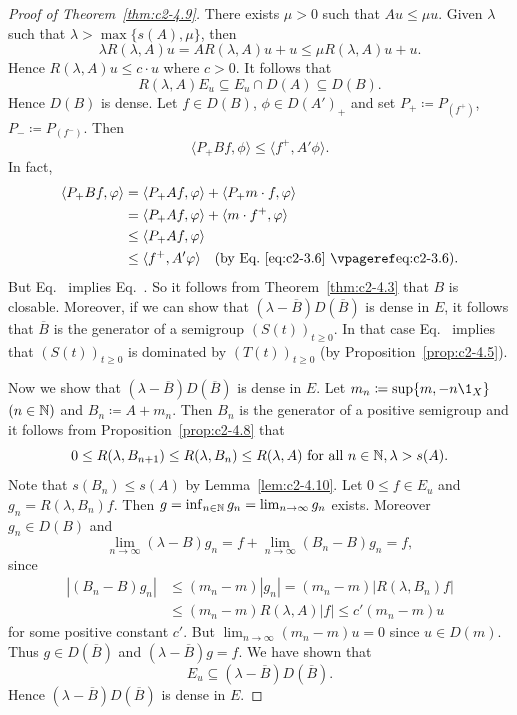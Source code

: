\begin{proof}[Proof of Theorem~\ref{thm:c2-4.9}]  
There exists $\mu > 0$ such that $Au \leq \mu u$.
Given $\lambda$ such that  $\lambda > \max \{s(A),\mu\}$, 
then 
\[
\lambda R(\lambda,A)u = AR(\lambda,A)u+u \leq \mu R(\lambda,A)u + u .
\]
Hence $R(\lambda,A)u \leq c \cdot u$ where $c > 0$.
It follows that 
\[
R(\lambda,A)E_{u} \subseteq E_{u} \cap D(A) \subseteq D(B) .
\]
Hence $D(B)$ is dense.
Let $f \in D(B)$, $\phi \in D(A')_{+}$ and set $P_{+} \coloneq P_{(f^{+})}$, $P_{-} \coloneq P_{(f^{-})}$.
Then
\begin{equation}\label{eq:c2-4.11}
\langle P_{+} Bf,\phi \rangle \leq \langle f^{+},A'\phi \rangle.
\end{equation}
In fact, 
\begin{align*}
\langle P_{+} Bf, \phi \rangle &= \langle P_{+} Af, \phi \rangle + \langle P_{+} m \cdot f, \phi \rangle\\
&= \langle P_{+} Af, \phi \rangle + \langle m \cdot f^{+}, \phi \rangle\\
&\leq \langle P_{+} Af, \phi \rangle\\
&\leq \langle f^{+}, A'\phi \rangle \quad \text{(by Eq.~\myeqpageref{eq:c2-3.6})}.
\end{align*}
But Eq.~ implies Eq.~.
So it follows from Theorem~\ref{thm:c2-4.3}   that $B$ is closable.
Moreover, if we can show that $(\lambda - \overline{B})D(\overline{B})$ is dense in $E$, it follows that $\overline{B}$ is the generator of a semigroup $(S(t))_{t \geq 0}$.
In that case Eq.~ implies that $(S(t))_{t \geq 0}$ is dominated by $(T(t))_{t \geq 0}$ 
(by Proposition~\ref{prop:c2-4.5}).

Now we show that $(\lambda - \overline{B})D(\overline{B})$ is dense in $E$.
Let $m_{n} \coloneq \sup \{m, -n \1_{X}\}$ $(n \in \mathbb{N} )$ and $B_{n} \coloneq A + m_{n}$.
Then $B_{n}$ is the generator of a positive semigroup and it follows from Proposition~\ref{prop:c2-4.8}  that 
\[
0 \leq R(\lambda,B_{n+1}) \leq R(\lambda,B_{n}) \leq R(\lambda,A) \text{ for all } n \in \N , \lambda > s(A) .
\]
Note that $s(B_{n}) \leq s(A)$ by Lemma~\ref{lem:c2-4.10}.
Let $0 \leq f \in E_{u}$ and $g_{n} = R(\lambda,B_{n})f$.
Then $g = \inf_{n \in \mathbb{N} } g_{n} = \lim_{n \to \infty} g_{n}$ exists.
Moreover $g_{n} \in D(B)$ and 
\[
\lim_{n \to \infty} (\lambda - B)g_{n} = f + \lim_{n \to \infty} (B_{n} - B)g_{n} = f ,
\]
since
\begin{equation*}
    \begin{split}
        |(B_{n} - B)g_{n}| &\leq (m_{n} - m)|g_{n}| = (m_{n} - m)|R(\lambda,B_{n})f| \\
        &\leq (m_{n} - m)R(\lambda,A)|f| \leq c' (m_{n} - m)u
    \end{split}
\end{equation*}
for some positive constant $c'$.
But $\lim_{n \to \infty} (m_{n} - m)u = 0$ since $u \in D(m)$.
Thus $g \in D(\overline{B})$ and $(\lambda - \overline{B})g = f$.
We have shown that 
\[
E_{u} \subseteq (\lambda - \overline{B})D(\overline{B}) .
\]
Hence $(\lambda - \overline{B})D(\overline{B})$ is dense in $E$.
\end{proof}
